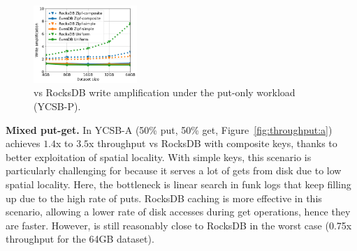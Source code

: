 
\begin{figure}[t]
	\centering
	\includegraphics[width=0.35\textwidth]{figs/write_amp_p_line.pdf}
	\caption{{\sys\/ vs RocksDB write amplification under the put-only workload (YCSB-P).}}
	\label{fig:writeamp}
\end{figure}


{\bf Mixed put-get.} In YCSB-A (50\% put, 50\% get, Figure~\ref{fig:throughput:a})
\sys\/ achieves $1.4$x to $3.5$x throughput vs RocksDB with composite keys, 
thanks to better exploitation of spatial locality. 
With simple keys, this scenario is 
particularly challenging for \sys\/ because it serves a lot of gets from disk due to 
low spatial locality. Here, the bottleneck is linear search in funk logs that keep filling 
up due to the high rate of puts.
RocksDB caching is more effective in this scenario, allowing a lower rate of disk accesses during get operations, hence they are
faster. However, \sys\/ is still reasonably close to RocksDB in the worst case 
(0.75x throughput for the 64GB dataset).

